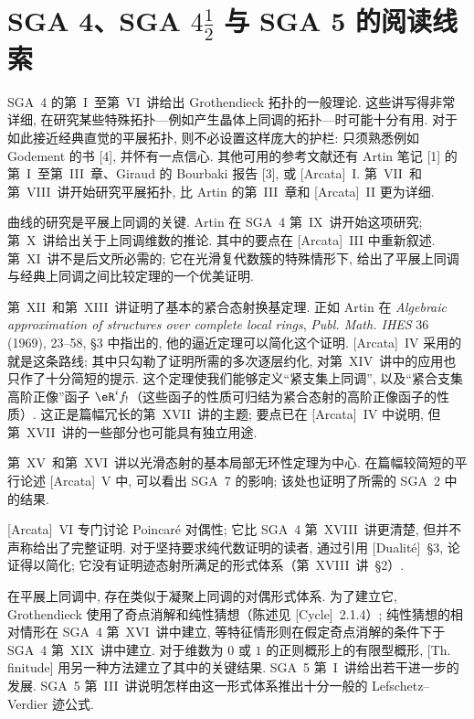 \chapter*{SGA 4、SGA \texorpdfstring{$4\frac12$}{4½} 与 SGA 5 的阅读线索}
\label{reading-guide}
SGA~4 的第~I~至第~VI~讲给出 Grothendieck 拓扑的一般理论. 这些讲写得非常详细, 在研究某些特殊拓扑---例如产生晶体上同调的拓扑---时可能十分有用. 对于如此接近经典直觉的平展拓扑, 则不必设置这样庞大的护栏: 只须熟悉例如 Godement 的书 [4], 并怀有一点信心. 其他可用的参考文献还有 Artin 笔记 [1] 的第~I~至第~III~章、Giraud 的 Bourbaki 报告 [3], 或 [Arcata]~I. 第~VII~和第~VIII~讲开始研究平展拓扑, 比 Artin 的第~III~章和 [Arcata]~II 更为详细.

曲线的研究是平展上同调的关键. Artin 在 SGA~4 第~IX~讲开始这项研究; 第~X~讲给出关于上同调维数的推论. 其中的要点在 [Arcata]~III 中重新叙述. 第~XI~讲不是后文所必需的; 它在光滑复代数簇的特殊情形下, 给出了平展上同调与经典上同调之间比较定理的一个优美证明.

第~XII~和第~XIII~讲证明了基本的紧合态射换基定理. 正如 Artin 在 \emph{Algebraic approximation of structures over complete local rings}, \emph{Publ. Math. IHES} 36 (1969), 23--58, \S3 中指出的, 他的逼近定理可以简化这个证明. [Arcata]~IV 采用的就是这条路线; 其中只勾勒了证明所需的多次逐层约化, 对第~XIV~讲中的应用也只作了十分简短的提示. 这个定理使我们能够定义“紧支集上同调”, 以及“紧合支集高阶正像”函子 $\eR^i f_!$（这些函子的性质可归结为紧合态射的高阶正像函子的性质）. 这正是篇幅冗长的第~XVII~讲的主题; 要点已在 [Arcata]~IV 中说明, 但第~XVII~讲的一些部分也可能具有独立用途.

第~XV~和第~XVI~讲以光滑态射的基本局部无环性定理为中心. 在篇幅较简短的平行论述 [Arcata]~V 中, 可以看出 SGA~7 的影响; 该处也证明了所需的 SGA~2 中的结果.

[Arcata]~VI 专门讨论 Poincaré 对偶性; 它比 SGA~4 第~XVIII~讲更清楚, 但并不声称给出了完整证明. 对于坚持要求纯代数证明的读者, 通过引用 [Dualité]~\S3, 论证得以简化; 它没有证明迹态射所满足的形式体系（第~XVIII~讲~\S2）.

在平展上同调中, 存在类似于凝聚上同调的对偶形式体系. 为了建立它,\newline
Grothendieck 使用了奇点消解和纯性猜想（陈述见 [Cycle]~2.1.4）; 纯性猜想的相对情形在 SGA~4 第~XVI~讲中建立, 等特征情形则在假定奇点消解的条件下于 SGA~4 第~XIX~讲中建立. 对于维数为 $0$ 或 $1$ 的正则概形上的有限型概形, [Th. finitude] 用另一种方法建立了其中的关键结果. SGA~5 第~I~讲给出若干进一步的发展. SGA~5 第~III~讲说明怎样由这一形式体系推出十分一般的 Lefschetz--\allowbreak Verdier 迹公式.

